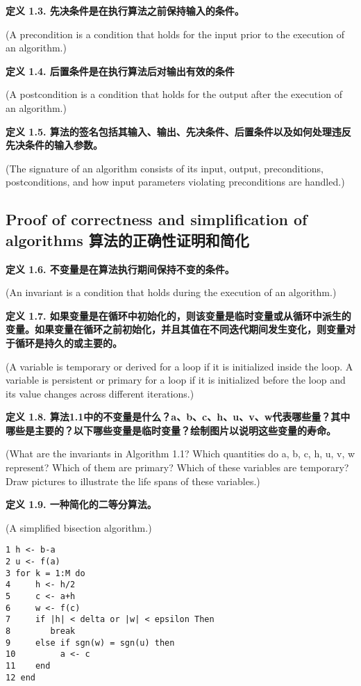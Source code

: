 \documentclass{ctexart}
\begin{document}
\textbf{定义 1.3. 先决条件是在执行算法之前保持输入的条件。}

(A precondition is a condition that holds for the input prior to the execution of an algorithm.)

\textbf{定义 1.4. 后置条件是在执行算法后对输出有效的条件}

(A postcondition is a condition that holds for the output after the execution of an algorithm.)

\textbf{定义 1.5. 算法的签名包括其输入、输出、先决条件、后置条件以及如何处理违反先决条件的输入参数。}

(The signature of an algorithm consists of its input, output, preconditions, postconditions, and how input parameters violating preconditions are handled.)

\subsection{Proof of correctness and simplification of algorithms 算法的正确性证明和简化}
\textbf{定义 1.6. 不变量是在算法执行期间保持不变的条件。}

(An invariant is a condition that holds during the execution of an algorithm.)

\textbf{定义 1.7. 如果变量是在循环中初始化的，则该变量是临时变量或从循环中派生的变量。如果变量在循环之前初始化，并且其值在不同迭代期间发生变化，则变量对于循环是持久的或主要的。}

(A variable is temporary or derived for a loop if it is initialized inside the loop. A variable is persistent or primary for a loop if it is initialized before the loop and its value changes across different iterations.)

\textbf{定义 1.8. 算法1.1中的不变量是什么？a、b、c、h、u、v、w代表哪些量？其中哪些是主要的？以下哪些变量是临时变量？绘制图片以说明这些变量的寿命。}

(What are the invariants in Algorithm 1.1? Which quantities do a, b, c, h, u, v, w represent? Which of them are primary? Which of these variables are temporary? Draw pictures to illustrate the life spans of these variables.)

\textbf{定义 1.9. 一种简化的二等分算法。}

(A simplified bisection algorithm.)

\begin{verbatim}
1 h <- b-a
2 u <- f(a)
3 for k = 1:M do
4     h <- h/2
5     c <- a+h
6     w <- f(c)
7     if |h| < delta or |w| < epsilon Then
8        break
9     else if sgn(w) = sgn(u) then
10         a <- c
11    end
12 end
\end{verbatim}
\end{document}
